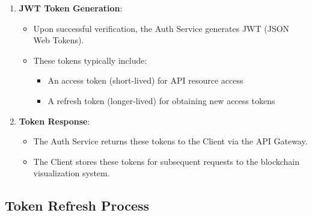 \begin{enumerate}
    \item \textbf{JWT Token Generation}:
    \begin{itemize}
        \item Upon successful verification, the Auth Service generates JWT (JSON Web Tokens).
        \item These tokens typically include:
        \begin{itemize}
            \item An access token (short-lived) for API resource access
            \item A refresh token (longer-lived) for obtaining new access tokens
        \end{itemize}
    \end{itemize}
    
    \item \textbf{Token Response}:
    \begin{itemize}
        \item The Auth Service returns these tokens to the Client via the API Gateway.
        \item The Client stores these tokens for subsequent requests to the blockchain visualization system.
    \end{itemize}
\end{enumerate}

\subsection{Token Refresh Process}

